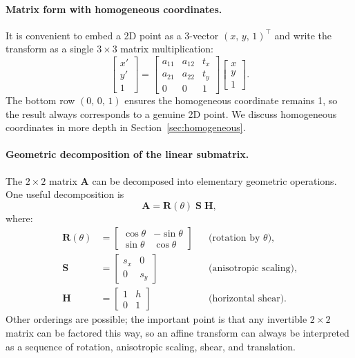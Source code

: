 \paragraph{Matrix form with homogeneous coordinates.}
It is convenient to embed a 2D point as a 3-vector $(x,\,y,\,1)^\top$ and write the transform as a single $3\times3$ matrix multiplication:
\[
\begin{bmatrix} x' \\ y' \\ 1 \end{bmatrix}
=
\begin{bmatrix}
    a_{11} & a_{12} & t_x \\
    a_{21} & a_{22} & t_y \\
    0      & 0      & 1
\end{bmatrix}
\begin{bmatrix} x \\ y \\ 1 \end{bmatrix}.
\]
The bottom row $(0,\,0,\,1)$ ensures the homogeneous coordinate remains 1, so the result always corresponds to a genuine 2D point.  We discuss homogeneous coordinates in more depth in Section~\ref{sec:homogeneous}.

\paragraph{Geometric decomposition of the linear submatrix.}
The $2\times2$ matrix $\mathbf{A}$ can be decomposed into elementary geometric operations.  One useful decomposition is
\[
    \mathbf{A} = \mathbf{R}(\theta)\; \mathbf{S}\; \mathbf{H},
\]
where:
\begin{align*}
    \mathbf{R}(\theta) &=
    \begin{bmatrix}
        \cos\theta & -\sin\theta \\
        \sin\theta &  \cos\theta
    \end{bmatrix}
    && \text{(rotation by $\theta$)}, \\[6pt]
    \mathbf{S} &=
    \begin{bmatrix}
        s_x & 0 \\
        0   & s_y
    \end{bmatrix}
    && \text{(anisotropic scaling)}, \\[6pt]
    \mathbf{H} &=
    \begin{bmatrix}
        1 & h \\
        0 & 1
    \end{bmatrix}
    && \text{(horizontal shear)}.
\end{align*}
Other orderings are possible; the important point is that any invertible $2\times2$ matrix can be factored this way, so an affine transform can always be interpreted as a sequence of rotation, anisotropic scaling, shear, and translation.

